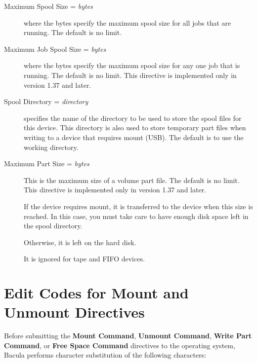 \begin{description}
\item [Maximum Spool Size = {\it bytes}]
   where the bytes specify the maximum spool size for all jobs that are
   running.  The default is no limit.

\item [Maximum Job Spool Size = {\it bytes}]
   where the bytes specify the maximum spool size for any one job  that is
   running. The default is no limit. 
   This directive is implemented only in version 1.37 and later.

\item [Spool Directory = {\it directory}]
   specifies the name of the directory to be used to store  the spool files for
   this device. This directory is also used to store  temporary part files when
   writing to a device that requires mount (USB).  The default is to use the
   working directory. 

\item [Maximum Part Size = {\it bytes}]
   This is the maximum size of a volume part file. The default is no limit.
   This directive is implemented only in version 1.37 and later.

   If the device requires  mount, it is transferred to the device when this size
   is reached.  In this case, you must take care to have enough disk space left
   in  the spool directory.  

   Otherwise, it is left on the hard disk.  

   It is ignored for tape and FIFO devices.  


\end{description}

\label{mountcodes}
\section{Edit Codes for Mount and Unmount Directives} 

Before submitting the {\bf Mount Command}, {\bf Unmount Command}, 
{\bf Write Part Command}, or {\bf Free Space Command} directives 
to the operating system, Bacula performs character substitution of the
following characters:

